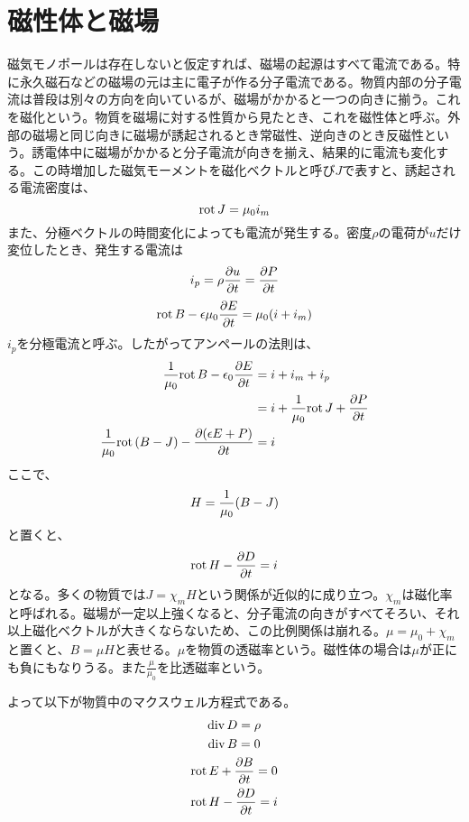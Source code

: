     \section{磁性体と磁場}
        磁気モノポールは存在しないと仮定すれば、磁場の起源はすべて電流である。特に永久磁石などの磁場の元は主に電子が作る分子電流である。物質内部の分子電流は普段は別々の方向を向いているが、磁場がかかると一つの向きに揃う。これを磁化という。物質を磁場に対する性質から見たとき、これを磁性体と呼ぶ。外部の磁場と同じ向きに磁場が誘起されるとき常磁性、逆向きのとき反磁性という。誘電体中に磁場がかかると分子電流が向きを揃え、結果的に電流も変化する。この時増加した磁気モーメントを磁化ベクトルと呼び$J$で表すと、誘起される電流密度は、
            \[\rot J = \mu_0i_m\]
        また、分極ベクトルの時間変化によっても電流が発生する。密度$\rho$の電荷が$u$だけ変位したとき、発生する電流は
            \[i_p = \rho\pd[u]{t} = \pd[P]{t}\]
            \[\rot B - \epsilon\mu_0\pd[E]{t} = \mu_0 (i + i_m)\]
        $i_p$を分極電流と呼ぶ。したがってアンペールの法則は、
        \begin{align*}
            \rec{\mu_0}\rot B - \epsilon_0 \pd[E]{t} &= i + i_m + i_p\\
            &= i + \rec{\mu_0}\rot J + \pd[P]{t}\\
            \rec{\mu_0}\rot(B - J) - \pd[(\epsilon E + P)]{t} &= i\\
        \end{align*}
        ここで、
            \[H = \rec{\mu_0}(B - J)\]
        と置くと、
            \[\rot H - \pd[D]{t} = i\]
        となる。多くの物質では$J = \chi_m H$という関係が近似的に成り立つ。$\chi_m$は磁化率と呼ばれる。磁場が一定以上強くなると、分子電流の向きがすべてそろい、それ以上磁化ベクトルが大きくならないため、この比例関係は崩れる。$\mu = \mu_0 + \chi_m$と置くと、$B = \mu H$と表せる。$\mu$を物質の透磁率という。磁性体の場合は$\mu$が正にも負にもなりうる。また$\frac{\mu}{\mu_0}$を比透磁率という。

    よって以下が物質中のマクスウェル方程式である。
    \begin{gather*}
        \dive D = \rho\\
        \dive B = 0\\
        \rot E + \pd[B]{t} = 0\\
        \rot H - \pd[D]{t} =  i
    \end{gather*}